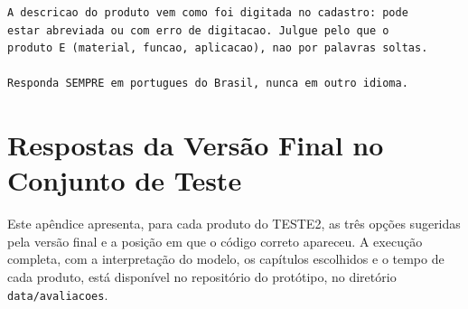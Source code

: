 \begin{apendicesenv}
{\begin{verbatim}
A descricao do produto vem como foi digitada no cadastro: pode
estar abreviada ou com erro de digitacao. Julgue pelo que o
produto E (material, funcao, aplicacao), nao por palavras soltas.

Responda SEMPRE em portugues do Brasil, nunca em outro idioma.
\end{verbatim}
}

\chapter{Respostas da Versão Final no Conjunto de Teste}
\label{ap:respostas}

Este apêndice apresenta, para cada produto do TESTE2, as três opções sugeridas pela versão final e a posição em que o código correto apareceu. A execução completa, com a interpretação do modelo, os capítulos escolhidos e o tempo de cada produto, está disponível no repositório do protótipo, no diretório \texttt{data/avaliacoes}.


\end{apendicesenv}
